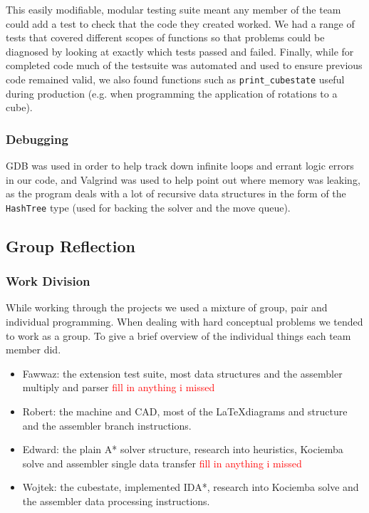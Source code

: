 \documentclass[8pt]{article}
\begin{document}
This easily modifiable, modular testing suite meant any member of the team could add a test to check that the code they created worked.
We had a range of tests that covered different scopes of functions so that problems could be diagnosed by looking at exactly which tests passed and failed.
Finally, while for completed code much of the testsuite was automated and used to ensure previous code remained valid, we also found functions such as 
\texttt{print\_cubestate} useful during production (e.g. when programming the application of rotations to a cube).

\subsubsection{Debugging}

GDB was used in order to help track down infinite loops and errant logic errors in our code, and Valgrind was used to help point out where memory was leaking, as the program deals with a lot of recursive data structures in the form of the \texttt{HashTree} type (used for backing the solver and the move queue).

\subsection{Group Reflection}

\subsubsection{Work Division}

While working through the projects we used a mixture of group, pair and individual
programming. When dealing with hard conceptual problems we tended to work as a 
group. To give a brief overview of the individual things each team member did.
\begin{itemize}
    \item Fawwaz: the extension test suite, most data structures and the assembler multiply and parser \textcolor{red}{fill in anything i missed}
    \item Robert: the machine and CAD, most of the \LaTeX \space diagrams and structure and
    the assembler branch instructions.
    \item Edward: the plain A* solver structure, research into heuristics, Kociemba 
    solve and assembler single data transfer \textcolor{red}{fill in anything i missed}
    \item Wojtek: the cubestate, implemented IDA*, research into Kociemba solve and the 
    assembler data processing instructions.
\end{itemize}
\end{document}
